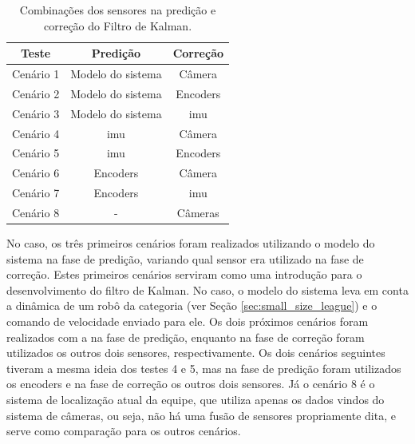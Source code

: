 \documentclass[acronym, symbols, table]{fei}
\begin{document}
		\begin{table}[!htb]
			\centering
			\caption{Combinações dos sensores na predição e correção do Filtro de Kalman.}
			\label{tbl:combinacao_sensores}
			\begin{tabular}{|c|c|c|}
				\hline
				\textbf{Teste}   & \textbf{Predição} & \textbf{Correção} \\ \hline
				Cenário 1 		 & Modelo do sistema & Câmera   		 \\ \hline
				Cenário 2 		 & Modelo do sistema & Encoders 		 \\ \hline
				Cenário 3 		 & Modelo do sistema & \acrshort{imu} 	 \\ \hline
				Cenário 4 		 & \acrshort{imu}    & Câmera   		 \\ \hline
				Cenário 5 		 & \acrshort{imu}    & Encoders 		 \\ \hline
				Cenário 6 		 & Encoders          & Câmera   		 \\ \hline
				Cenário 7 		 & Encoders          & \acrshort{imu} 	 \\ \hline
				Cenário 8 		 & - 			 	 & Câmeras 			 \\ \hline
			\end{tabular}
		\end{table}
		
		No caso, os três primeiros cenários foram realizados utilizando o modelo do sistema na fase de predição, variando qual sensor era utilizado na fase de correção. Estes primeiros cenários serviram como uma introdução para o desenvolvimento do filtro de Kalman. No caso, o modelo do sistema leva em conta a dinâmica de um robô da categoria  (ver Seção \ref{sec:small_size_league}) e o comando de velocidade enviado para ele. Os dois próximos cenários foram realizados com a  na fase de predição, enquanto na fase de correção foram utilizados os outros dois sensores, respectivamente. Os dois cenários seguintes tiveram a mesma ideia dos testes 4 e 5, mas na fase de predição foram utilizados os encoders e na fase de correção os outros dois sensores. Já o cenário 8 é o sistema de localização atual da equipe, que utiliza apenas os dados vindos do sistema de câmeras, ou seja, não há uma fusão de sensores propriamente dita, e serve como comparação para os outros cenários.
		
\end{document}
